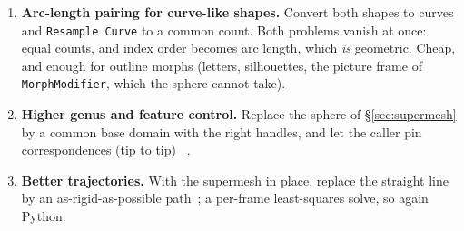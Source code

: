 \documentclass[11pt,a4paper]{article}
\newcommand{\node}[1]{\texttt{#1}}
\begin{document}
\begin{enumerate}[leftmargin=1.6em]
  \item \textbf{Arc-length pairing for curve-like shapes.} Convert both
    shapes to curves and \node{Resample Curve} to a common count. Both
    problems vanish at once: equal counts, and index order becomes arc
    length, which \emph{is} geometric. Cheap, and enough for outline
    morphs (letters, silhouettes, the picture frame of
    \node{MorphModifier}, which the sphere cannot take).
  \item \textbf{Higher genus and feature control.} Replace the sphere of
    \S\ref{sec:supermesh} by a common base domain with the right handles,
    and let the caller pin correspondences (tip to tip)
    ~\cite{praun2001,kraevoy2004,schreiner2004}.
  \item \textbf{Better trajectories.} With the supermesh in place, replace
    the straight line by an as-rigid-as-possible path~\cite{alexa2000}; a
    per-frame least-squares solve, so again Python.
\end{enumerate}
\end{document}
